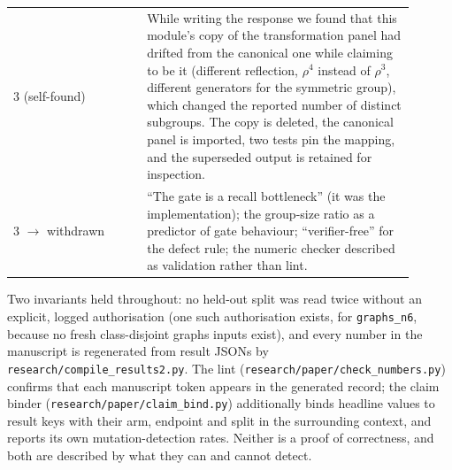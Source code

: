 \documentclass{neurips_2024}
\begin{document}
\begin{table}[t]
\begin{tabular}{@{}p{0.30\linewidth}p{0.60\linewidth}@{}}
3 (self-found) & While writing the response we found that this module's copy of the
transformation panel had drifted from the canonical one while claiming to be it (different
reflection, $\rho^4$ instead of $\rho^3$, different generators for the symmetric group), which
changed the reported number of distinct subgroups. The copy is deleted, the canonical panel is
imported, two tests pin the mapping, and the superseded output is retained for inspection. \\
3 $\to$ withdrawn & ``The gate is a recall bottleneck'' (it was the implementation); the
group-size ratio as a predictor of gate behaviour; ``verifier-free'' for the defect rule; the
numeric checker described as validation rather than lint. \\
\bottomrule
\end{tabular}
\end{table}

Two invariants held throughout: no held-out split was read twice without an explicit,
logged authorisation (one such authorisation exists, for \texttt{graphs\_n6}, because no fresh
class-disjoint graphs inputs exist), and every number in the manuscript is regenerated from
result JSONs by \texttt{research/compile\_results2.py}. The lint
(\texttt{research/paper/check\_numbers.py}) confirms that each manuscript token appears in the
generated record; the claim binder (\texttt{research/paper/claim\_bind.py}) additionally binds
headline values to result keys with their arm, endpoint and split in the surrounding context,
and reports its own mutation-detection rates. Neither is a proof of correctness, and both are
described by what they can and cannot detect.
\end{document}

